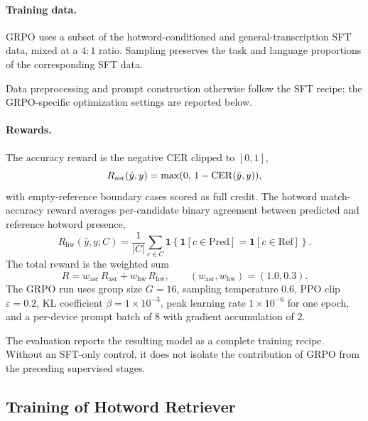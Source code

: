 \paragraph{Training data.}
GRPO uses a subset of the hotword-conditioned and general-transcription
SFT data, mixed at a $4{:}1$ ratio. Sampling preserves the task and
language proportions of the corresponding SFT data.

Data preprocessing and prompt construction otherwise follow the SFT
recipe; the GRPO-specific optimization settings are reported below.

\paragraph{Rewards.}
The accuracy reward is the negative CER clipped to $[0, 1]$,
\begin{equation}
  R_\mathrm{asr}(\hat{y}, y) = \max(0,\, 1 - \mathrm{CER}(\hat{y}, y)),
  \label{eq:reward-asr}
\end{equation}
with empty-reference boundary cases scored as full credit.
The hotword match-accuracy reward averages per-candidate binary
agreement between predicted and reference hotword presence,
\begin{equation}
  R_\mathrm{hw}(\hat{y}, y; C) = \frac{1}{|C|}\sum_{c \in C}
    \mathbf{1}\!\left\{\mathbf{1}[c \in \mathrm{Pred}] = \mathbf{1}[c \in \mathrm{Ref}]\right\}.
  \label{eq:reward-hw}
\end{equation}
The total reward is the weighted sum
\begin{equation}
  R = w_\mathrm{asr}\, R_\mathrm{asr} + w_\mathrm{hw}\, R_\mathrm{hw},
  \qquad (w_\mathrm{asr}, w_\mathrm{hw}) = (1.0, 0.3).
  \label{eq:reward-total}
\end{equation}
The GRPO run uses group size $G=16$, sampling temperature $0.6$, PPO
clip $\varepsilon=0.2$, KL coefficient $\beta=1\!\times\!10^{-3}$,
peak learning rate $1\!\times\!10^{-6}$ for one epoch, and a
per-device prompt batch of $8$ with gradient accumulation of $2$.

The evaluation reports the resulting model as a complete training
recipe. Without an SFT-only control, it does not isolate the
contribution of GRPO from the preceding supervised stages.

\subsection{Training of Hotword Retriever}
\label{subsec:hotword-retriever}

